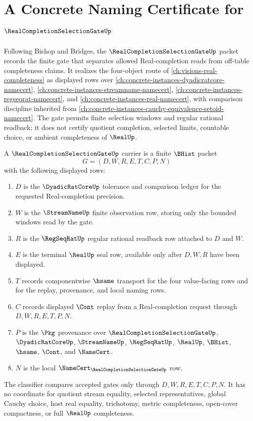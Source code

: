 \chapter{A Concrete Naming Certificate for $\RealCompletionSelectionGateUp$}
\label{ch:concrete-instances-real-completion-selection-gate-namecert}

Following Bishop and Bridges, the $\RealCompletionSelectionGateUp$ packet records the finite gate that separates allowed Real-completion reads from off-table completeness claims. It realizes the four-object route of \autoref{ch:visions-real-completeness} as displayed rows over \autoref{ch:concrete-instances-dyadicratcore-namecert}, \autoref{ch:concrete-instances-streamname-namecert}, \autoref{ch:concrete-instances-regseqrat-namecert}, and \autoref{ch:concrete-instances-real-namecert}, with comparison discipline inherited from \autoref{ch:concrete-instances-cauchy-equivalence-setoid-namecert}. The gate permits finite selection windows and regular rational readback; it does not certify quotient completion, selected limits, countable choice, or ambient completeness of $\RealUp$.

\begin{definition}
\label{def:real-completion-selection-gate-carrier}
A $\RealCompletionSelectionGateUp$ carrier is a finite $\BHist$ packet
$$
G=(D,W,R,E,T,C,P,N)
$$
with the following displayed rows:
\begin{enumerate}
\item $D$ is the $\DyadicRatCoreUp$ tolerance and comparison ledger for the requested Real-completion precision.
\item $W$ is the $\StreamNameUp$ finite observation row, storing only the bounded windows read by the gate.
\item $R$ is the $\RegSeqRatUp$ regular rational readback row attached to $D$ and $W$.
\item $E$ is the terminal $\RealUp$ seal row, available only after $D,W,R$ have been displayed.
\item $T$ records componentwise $\hsame$ transport for the four value-facing rows and for the replay, provenance, and local naming rows.
\item $C$ records displayed $\Cont$ replay from a Real-completion request through $D,W,R,E,T,P,N$.
\item $P$ is the $\Pkg$ provenance over $\RealCompletionSelectionGateUp$, $\DyadicRatCoreUp$, $\StreamNameUp$, $\RegSeqRatUp$, $\RealUp$, $\BHist$, $\hsame$, $\Cont$, and $\NameCert$.
\item $N$ is the local $\NameCert_{\RealCompletionSelectionGateUp}$ row.
\end{enumerate}
The classifier compares accepted gates only through $D,W,R,E,T,C,P,N$. It has no coordinate for quotient stream equality, selected representatives, global Cauchy choice, host real equality, trichotomy, metric completeness, open-cover compactness, or full $\RealUp$ completeness.
\end{definition}

